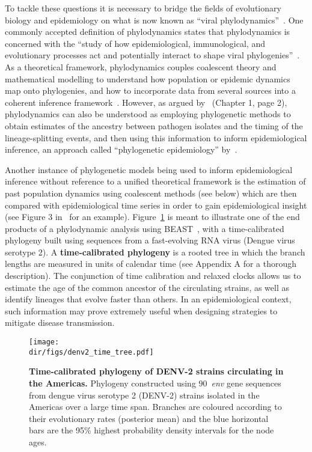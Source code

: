 To tackle these questions it is necessary to bridge the fields of evolutionary biology and epidemiology on what is now known as ``viral phylodynamics''~\citep{Grenfell2004,Volz2013,Pybus2013}.
One commonly accepted definition of phylodynamics states that phylodynamics is concerned with the ``study of how epidemiological, immunological, and evolutionary processes act and potentially interact to shape viral phylogenies''~\citep{Grenfell2004}.
As a theoretical framework, phylodynamics couples coalescent theory and mathematical modelling to understand how population or epidemic dynamics map onto phylogenies, and how to incorporate data from several sources into a coherent inference framework~\citep{Kuhnert2011}.
However, as argued by~\cite{Hall2015} (Chapter 1, page 2), phylodynamics can also be understood as employing phylogenetic methods to obtain estimates of the ancestry between pathogen isolates and the timing of the lineage-splitting events, and then using this information to inform epidemiological inference, an approach called ``phylogenetic epidemiology'' by~\cite{Kuhnert2011}.

Another instance of phylogenetic models being used to inform epidemiological inference without reference to a unified theoretical framework is the estimation of past population dynamics using coalescent methods (see below) which are then compared with epidemiological time series in order to gain epidemiological insight (see Figure 3 in~\cite{Bennett2009} for  an example).
Figure~\ref{fig:timetree} is meant to illustrate one of the end products of a phylodynamic analysis using BEAST~\citep{Drummond2007,Drummond2012}, with a time-calibrated phylogeny built using sequences from a fast-evolving RNA virus (Dengue virus serotype 2).
A \textbf{time-calibrated phylogeny} is a rooted tree in which the branch lengths are measured in units of calendar time (see Appendix A for a thorough description).
The conjunction of time calibration and relaxed clocks allows us to estimate the age of the common ancestor of the circulating strains, as well as identify lineages that evolve faster than others.
In an epidemiological context, such information may prove extremely useful when designing strategies to mitigate disease transmission.

\begin{figure}[!ht]
\begin{center}
\texttt{[image: \\dir/figs/denv2\_time\_tree.pdf]} 
\end{center}
 \caption[Time-calibrated phylogeny of DENV-2 strains circulating in the Americas.]{\textbf{Time-calibrated phylogeny of DENV-2 strains circulating in the Americas.}
 Phylogeny constructed using $90$~\textit{env} gene sequences from dengue virus serotype 2 (DENV-2) strains isolated in the Americas over  a large time span. 
 Branches are coloured according to their  evolutionary rates (posterior mean) and the blue horizontal bars are the 95\% highest probability density intervals for the node ages. 
 }
 \label{fig:timetree}
\end{figure}


